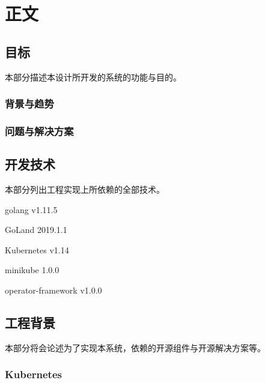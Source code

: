 
\newcommand{\paragraphnl}[1]{\paragraph{#1}\hspace{0pt}\\}

\section{正文}

\subsection{目标}

本部分描述本设计所开发的系统的功能与目的。

\subsubsection{背景与趋势}



\subsubsection{问题与解决方案}



\subsection{开发技术}

本部分列出工程实现上所依赖的全部技术。

golang v1.11.5

GoLand 2019.1.1

Kubernetes v1.14

minikube 1.0.0

operator-framework v1.0.0

\subsection{工程背景}

本部分将会论述为了实现本系统，依赖的开源组件与开源解决方案等。

\subsubsection{Kubernetes}

